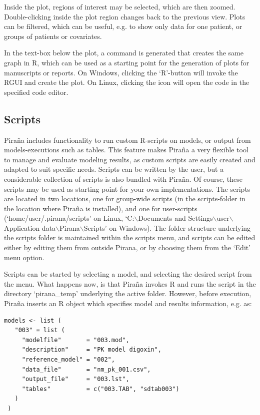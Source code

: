 \documentclass[a4,11pt]{report} \usepackage[pdftex]{graphicx}
\begin{document}
{Inside the plot, regions of interest may be selected, which are
then zoomed. Double-clicking inside the plot region changes
back to the previous view. Plots can be filtered, which can be useful,
e.g. to show only data for one patient, or groups of patients or
covariates.

In the text-box below the plot, a command is generated that creates
the same graph in R, which can be used as a starting point for the
generation of plots for manuscripts or reports. On Windows, clicking the
`R'-button will invoke the RGUI and create the plot. On Linux,
clicking the icon will open the code in the specified code editor.

\subsection{Scripts}
Pira\~na includes functionality to run custom R-scripts on models, or
output from models-executions such as tables. This feature makes
Pira\~na a very flexible tool to manage and evaluate modeling results,
as custom scripts are easily created and adapted to suit specific
needs. Scripts can be written by the user, but a considerable
collection of scripts is also bundled with Pira\~na. Of course, these
scripts may be used as starting point for your own
implementations. The scripts are located in two locations, one for
group-wide scripts (in the scripts-folder in the location where
Pira\~na is installed), and one for user-scripts
(`home/user/.pirana/scripts' on Linux, `C:$\backslash$Documents and
Settings$\backslash$user$\backslash$Application
data$\backslash$Pirana$\backslash$Scripts' on Windows). The folder
structure underlying the scripts folder is maintained within the
scripts menu, and scripts can be edited either by editing them from
outside Pirana, or by choosing them from the `Edit' menu option.

Scripts can be started by selecting a model, and selecting the desired
script from the menu. What happens now, is that Pira\~na invokes R and
runs the script in the directory `pirana\_temp' underlying the active
folder.  However, before execution, Pira\~na inserts an R object which
specifies model and results information, e.g. as:

\begin{verbatim}
models <- list (
   "003" = list (
     "modelfile"       = "003.mod",
     "description"     = "PK model digoxin",
     "reference_model" = "002",
     "data_file"       = "nm_pk_001.csv",
     "output_file"     = "003.lst",
     "tables"          = c("003.TAB", "sdtab003")
   )
 )
\end{verbatim}

}
\end{document}
